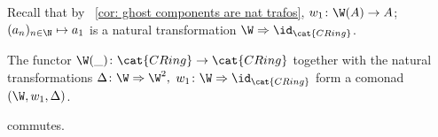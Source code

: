 Recall that by ~\ref{cor: ghost components are nat trafos},
$w_1 \colon \W(A) \to A$; $(a_n)_{n \in \N} \mapsto a_1$
is a natural transformation $\W \Rightarrow \id_{\cat{CRing}}$.
\begin{theorem} \label{thm: comonad structure}
    The functor $\W(\_) \colon \cat{CRing} \to \cat{CRing}$ together with the
    natural transformations $\Delta \colon \W \Rightarrow \W^2,$ $w_1 \colon 
    \W \Rightarrow \id_{\cat{CRing}}$ form a comonad $(\W,w_1,\Delta)$.
\end{theorem}
\begin{bigproof}
    \begin{claim*}
        
        commutes.
        

\end{claim*}
\end{bigproof}
